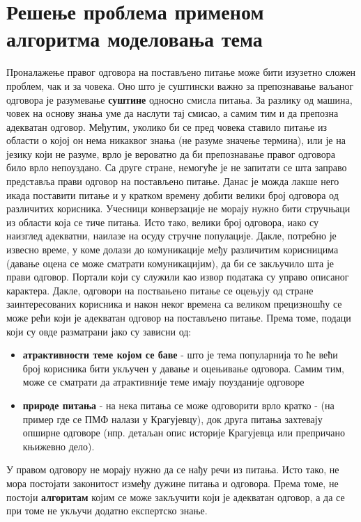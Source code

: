 \chapter{Решење проблема применом алгоритма моделовања тема}

Проналажење правог одговора на постављено питање може бити изузетно сложен проблем, чак и за човека. Оно што је суштински важно за препознавање ваљаног одговора је разумевање \textbf{суштине} односно смисла питања. За разлику од машина, човек на основу знања уме да наслути тај смисао, а самим тим и да препозна адекватан одговор. Међутим, уколико би се пред човека ставило питање из области о којој он нема никаквог знања (не разуме значење термина), или је на језику који не разуме, врло је вероватно да би препознавање правог одговора било врло непоуздано. 
Са друге стране, немогуће је не запитати се шта заправо представља прави одговор на постављено питање. Данас је можда лакше него икада поставити питање и у кратком времену добити велики број одговора од различитих корисника. Учесници конверзације не морају нужно бити стручњаци из области која се тиче питања. Исто тако, велики број одговора, иако су наизглед адекватни, наилазе на осуду стручне популације. Дакле, потребно је извесно време, у коме долази до комуникације међу различитим корисницима (давање оцена се може сматрати комуникацијим), да би се закључило шта је прави одговор. 
Портали који су служили као извор података су управо описаног карактера. Дакле, одговори на поствањено питање се оцењују од стране заинтересованих корисника и након неког времена са великом прецизношћу се може рећи који је адекватан одговор на постављено питање. Према томе, подаци који су овде разматрани јако су зависни од:

\begin{itemize}
\item \textbf{атрактивности теме којом се баве} - што је тема популарнија то ће већи број корисника бити укључен у давање и оцењивање одговора. Самим тим, може се сматрати да атрактивније теме имају поузданије одговоре
\item \textbf{природе питања} - на нека питања се може одговорити врло кратко - (на пример где се ПМФ налази у Крагујевцу), док друга питања захтевају опширне одговоре (нпр. детаљан опис историје Крагујевца или препричано књижевно дело).
\end{itemize}

У правом одговору не морају нужно да се нађу речи из питања. Исто тако, не мора постојати законитост између дужине питања и одговора. Према томе, не постоји \textbf{алгоритам} којим се може закључити који је адекватан одговор, а да се при томе не укључи додатно експертско знање. 


